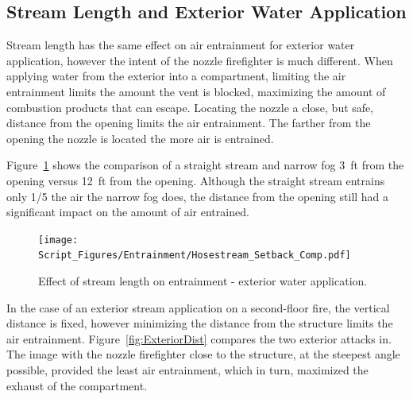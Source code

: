 \documentclass[12pt,oneside]{book}
\begin{document}
\subsection{Stream Length and Exterior Water Application}
Stream length has the same effect on air entrainment for exterior water application, however the intent of the nozzle firefighter is much different. When applying water from the exterior into a compartment, limiting the air entrainment limits the amount the vent is blocked, maximizing the amount of combustion products that can escape. Locating the nozzle a close, but safe, distance from the opening limits the air entrainment. The farther from the opening the nozzle is located the more air is entrained. 

Figure~\ref{fig:Hosestream_Setback_Comp} shows the comparison of a straight stream and narrow fog 3~ft from the opening versus 12~ft from the opening. Although the straight stream entrains only 1/5 the air the narrow fog does, the distance from the opening still had a significant impact on the amount of air entrained.

\begin{figure}[H]
\centering
\texttt{[image: Script\_Figures/Entrainment/Hosestream\_Setback\_Comp.pdf]}
\caption[Effect of Stream Length on Entrainment - Exterior Water Application]{Effect of stream length on entrainment - exterior water application.}
\label{fig:Hosestream_Setback_Comp}
\end{figure}

In the case of an exterior stream application on a second-floor fire, the vertical distance is fixed, however minimizing the distance from the structure limits the air entrainment. Figure~\ref{fig:ExteriorDist} compares the two exterior attacks in. The image with the nozzle firefighter close to the structure, at the steepest angle possible, provided the least air entrainment, which in turn, maximized the exhaust of the compartment.
\end{document}
